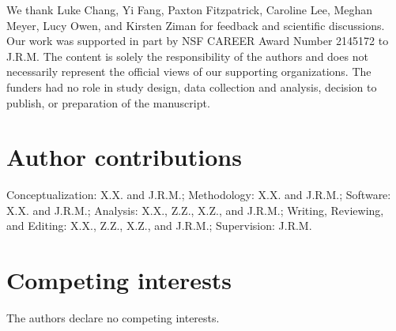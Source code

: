 \documentclass[10pt]{article}
\begin{document}
We thank Luke Chang, Yi Fang, Paxton Fitzpatrick, Caroline Lee, Meghan Meyer, Lucy Owen, and Kirsten Ziman for feedback and scientific discussions. Our work was supported in part by NSF CAREER Award Number 2145172 to J.R.M. The content is solely the responsibility of the authors and does not necessarily represent the official views of our supporting organizations. The funders had no role in study design, data collection and analysis, decision to publish, or preparation of the manuscript.

\section*{Author contributions}

Conceptualization: X.X. and J.R.M.; Methodology: X.X. and J.R.M.; Software: X.X. and J.R.M.; Analysis: X.X., Z.Z., X.Z., and J.R.M.; Writing, Reviewing, and Editing: X.X., Z.Z., X.Z., and J.R.M.; Supervision: J.R.M.

\section*{Competing interests}

The authors declare no competing interests.
\end{document}

